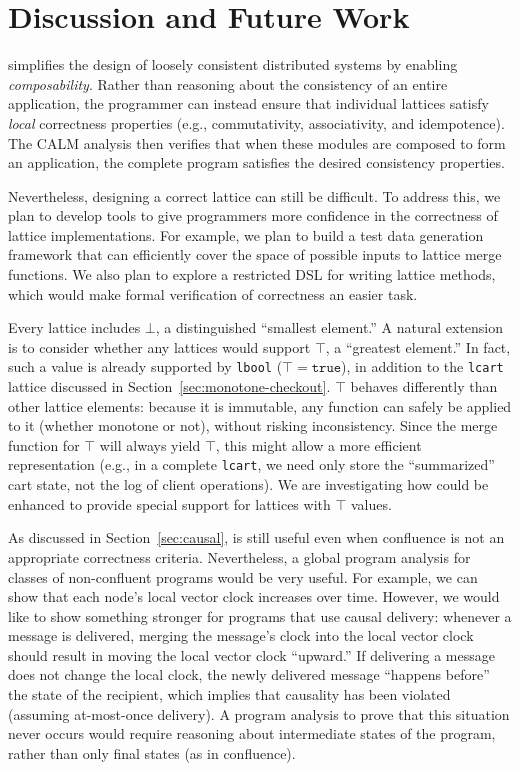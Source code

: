 \section{Discussion and Future Work}
\label{sec:discussion}

\lang simplifies the design of loosely consistent distributed systems by
enabling \emph{composability}. Rather than reasoning about the consistency of an
entire application, the programmer can instead ensure that individual lattices
satisfy \emph{local} correctness properties (e.g., commutativity, associativity,
and idempotence). The CALM analysis then verifies that when these modules are
composed to form an application, the complete program satisfies the desired
consistency properties.

Nevertheless, designing a correct lattice can still be difficult. To address
this, we plan to develop tools to give programmers more confidence in the
correctness of lattice implementations. For example, we plan to build a test
data generation framework that can efficiently cover the space of possible
inputs to lattice merge functions. We also plan to explore a restricted DSL for
writing lattice methods, which would make formal verification of correctness an
easier task.

Every lattice includes $\bot$, a distinguished ``smallest element.'' A natural
extension is to consider whether any lattices would support $\top$, a ``greatest
element.'' In fact, such a value is already supported by \texttt{lbool} ($\top =
\mathtt{true}$), in addition to the \texttt{lcart} lattice discussed in
Section~\ref{sec:monotone-checkout}. $\top$ behaves differently than other
lattice elements: because it is immutable, any function can safely be applied to
it (whether monotone or not), without risking inconsistency. Since the merge
function for $\top$ will always yield $\top$, this might allow a more efficient
representation (e.g., in a complete \texttt{lcart}, we need only store the
``summarized'' cart state, not the log of client operations). We are
investigating how \lang could be enhanced to provide special support for
lattices with $\top$ values.

As discussed in Section~\ref{sec:causal}, \lang is still useful even when
confluence is not an appropriate correctness criteria. Nevertheless, a global
program analysis for classes of non-confluent programs would be very useful. For
example, we can show that each node's local vector clock increases over
time. However, we would like to show something stronger for programs that use
causal delivery: whenever a message is delivered, merging the message's clock
into the local vector clock should result in moving the local vector clock
``upward.'' If delivering a message does not change the local clock, the newly
delivered message ``happens before'' the state of the recipient, which implies
that causality has been violated (assuming at-most-once delivery). A program
analysis to prove that this situation never occurs would require reasoning about
intermediate states of the program, rather than only final states (as in
confluence).

